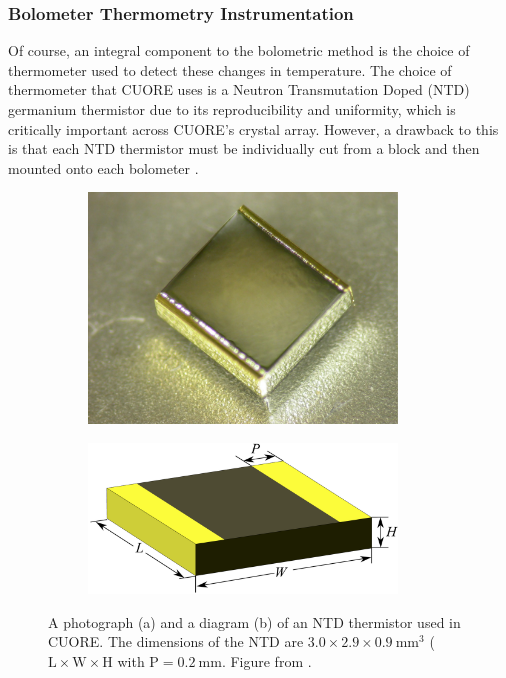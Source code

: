 \subsubsection*{Bolometer Thermometry Instrumentation}
Of course, an integral component to the bolometric method is the choice of thermometer used to detect these changes in temperature.
The choice of thermometer that CUORE uses is a Neutron Transmutation Doped (NTD) germanium thermistor due to its reproducibility and uniformity, which is critically important across CUORE's crystal array. However, a drawback to this is that each NTD thermistor must be individually cut from a block and then mounted onto each bolometer \cite{NTDThermistor}.

\begin{figure}[htbp]
\centering
\begin{subfigure}[t]{0.40\textwidth}
\centering
\includegraphics[width=0.9\textwidth]{Figures/fig04a.pdf}
\caption{}
\label{fig:NTD_picture}
\end{subfigure}
\qquad
\begin{subfigure}[t]{0.40\textwidth}
\centering
\includegraphics[width=0.9\textwidth]{Figures/fig04b.pdf}
\caption{}
\label{fig:NTD_sketch}
\end{subfigure}
\caption[A photograph (a) and a diagram (b) of an NTD thermistor used in CUORE.]
{A photograph (a) and a diagram (b) of an NTD thermistor used in CUORE.
The dimensions of the NTD are $3.0\times2.9\times0.9~\textrm{mm}^3$ ($\textrm{L} \times \textrm{W} \times \textrm{H}$ with $\textrm{P}=0.2~\textrm{mm}$.
Figure from \cite{Alduino:2016vjd}.}
\label{fig:NTD}
\end{figure}

